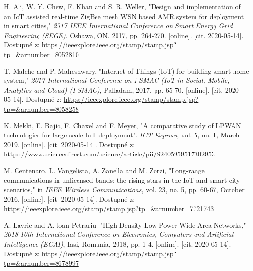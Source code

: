

\begin{thebibliography}{9}



H. Ali, W. Y. Chew, F. Khan and S. R. Weller, "Design and implementation of an IoT assisted real-time ZigBee mesh WSN based AMR system for deployment in smart cities," \textit{2017 IEEE International Conference on Smart Energy Grid Engineering (SEGE)}, Oshawa, ON, 2017, pp. 264-270.
[online]. [cit. 2020-05-14]. Dostupné z: 
\url{
https://ieeexplore.ieee.org/stamp/stamp.jsp?tp=&arnumber=8052810
}
 


T. Malche and P. Maheshwary, "Internet of Things (IoT) for building smart home system," \textit{2017 International Conference on I-SMAC (IoT in Social, Mobile, Analytics and Cloud) (I-SMAC)}, Palladam, 2017, pp. 65-70.
[online]. [cit. 2020-05-14]. Dostupné z: 
\url{
https://ieeexplore.ieee.org/stamp/stamp.jsp?tp=&arnumber=8058258
}
 


K. Mekki, E. Bajic, F. Chaxel and F. Meyer, "A comparative study of LPWAN technologies for large-scale IoT deployment". \textit{ICT Express}, vol. 5, no. 1, March 2019.
[online]. [cit. 2020-05-14]. Dostupné z: 
\url{
https://www.sciencedirect.com/science/article/pii/S2405959517302953
}
 

M. Centenaro, L. Vangelista, A. Zanella and M. Zorzi, "Long-range communications in unlicensed bands: the rising stars in the IoT and smart city scenarios," in \textit{IEEE Wireless Communications}, vol. 23, no. 5, pp. 60-67, October 2016.
[online]. [cit. 2020-05-14]. Dostupné z: 
\url{
https://ieeexplore.ieee.org/stamp/stamp.jsp?tp=&arnumber=7721743
}
 

A. Lavric and A. loan Petrariu, "High-Density Low Power Wide Area Networks," \textit{2018 10th International Conference on Electronics, Computers and Artificial Intelligence (ECAI)}, Iasi, Romania, 2018, pp. 1-4.
[online]. [cit. 2020-05-14]. Dostupné z: 
\url{
https://ieeexplore.ieee.org/stamp/stamp.jsp?tp=&arnumber=8678997
}
 


\end{thebibliography}
